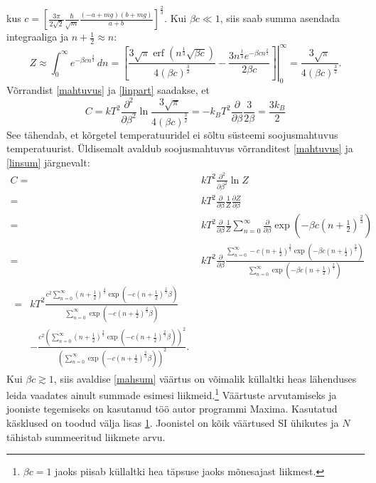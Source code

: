 \documentclass{trkut}%
\DeclareMathOperator{\erf}{erf}
\begin{document}
kus $c=\left[\frac{3\pi}{2\sqrt{2}} \frac{\hbar}{\sqrt{m}} \frac{(-a+mg)(b+mg)}{a+b}\right]^{\frac{2}{3}}$.
Kui $\beta c\ll 1$, siis saab summa asendada integraaliga ja $n+\frac{1}{2}\approx n$:
\begin{equation}
    Z \approx \int_0^\infty e^{-\beta c n^\frac{2}{3}} \, dn = \left.\left[ \frac{3\sqrt{\pi}  \erf{\left( {n}^\frac{1}{3} \sqrt{\beta c}\right)} }{4 (\beta c)^\frac{3}{2}}-\frac{3n^\frac{1}{3} e^{-\beta cn^\frac{2}{3}}}{2 \beta c }\right]\right|^{\infty}_{0} =\frac{3\sqrt{\pi}}{4(\beta c)^\frac{3}{2}} .
    \label{linpart}
\end{equation}
Võrrandist \eqref{mahtuvus} ja \eqref{linpart} saadakse, et
\begin{equation} \label{intmahtuvus}
    C=kT^2 \frac{\partial^2}{\partial \beta^2} \ln \frac{3\sqrt{\pi}}{4(\beta c)^\frac{3}{2}}=-k_BT^2\frac{\partial}{\partial \beta} \frac{3}{2\beta}=\frac{3k_B}{2}
\end{equation}
See tähendab, et kõrgetel temperatuuridel ei sõltu süsteemi soojusmahtuvus temperatuurist.
Üldisemalt avaldub soojusmahtuvus võrranditest \eqref{mahtuvus} ja \eqref{linsum} järgnevalt:
\begin{align}
    C={}&kT^2 \frac{\partial^2}{\partial \beta^2} \ln Z \nonumber \\
    ={}&kT^2\frac{\partial}{\partial \beta}\frac{1}{Z} \frac{\partial Z}{\partial \beta} \nonumber \\
    ={}&kT^2\frac{\partial}{\partial \beta}\frac{1}{Z} \sum_{n=0}^{\infty} \frac{\partial}{\partial \beta} \exp \left( -\beta c \left(n+\frac{1}{2}\right)^\frac{2}{3} \right) \nonumber \\
    ={}&kT^2\frac{\partial}{\partial \beta} \frac{\sum_{n=0}^{\infty} -c\left(n+\frac{1}{2}\right)^\frac{2}{3} \exp \left( -\beta c \left(n+\frac{1}{2}\right)^\frac{2}{3} \right)}{\sum_{n=0}^{\infty} \exp \left( -\beta c \left(n+\frac{1}{2}\right)^\frac{2}{3} \right)} \nonumber \\
    \begin{split}\label{mahsum}
        ={}&kT^2 \frac{c^2 \sum_{n=0}^\infty \left( n+\frac{1}{2}\right)^\frac{4}{3} \exp \left( -c \left( n+\frac{1}{2} \right)^\frac{2}{3} \beta \right) }{\sum_{n=0}^\infty {{\exp}\left( -c {{\left( n+\frac{1}{2}\right) }^{\frac{2}{3}}} \beta \right)}}  \\
        & - \frac{c^2 \left( \sum_{n=0}^{\infty }{{{\left( n+\frac{1}{2}\right) }^{\frac{2}{3}}} {{ \exp}\left( -c {{\left( n+\frac{1}{2}\right) }^{\frac{2}{3}}} \beta \right)}}\right)^{2}}{{{\left( \sum_{n=0}^{\infty }{ {{\exp}\left( -c {{\left( n+\frac{1}{2}\right) }^{\frac{2}{3}}} \beta \right)}}\right) }^{2}}}.
    \end{split}
\end{align}
Kui $\beta c \gtrsim 1$, siis avaldise \eqref{mahsum} väärtus on võimalik küllaltki heas lähenduses leida vaadates ainult summade esimesi liikmeid.\footnote{$\beta c =1$ jaoks piisab küllaltki hea täpsuse jaoks mõnesajast liikmest.}
Väärtuste arvutamiseks ja jooniste tegemiseks on kasutanud töö autor programmi Maxima.
Kasutatud käsklused on toodud välja lisas \hyperref[maximalisa]{1}.
Joonistel on kõik väärtused SI ühikutes ja $N$ tähistab summeeritud liikmete arvu.
\end{document}
